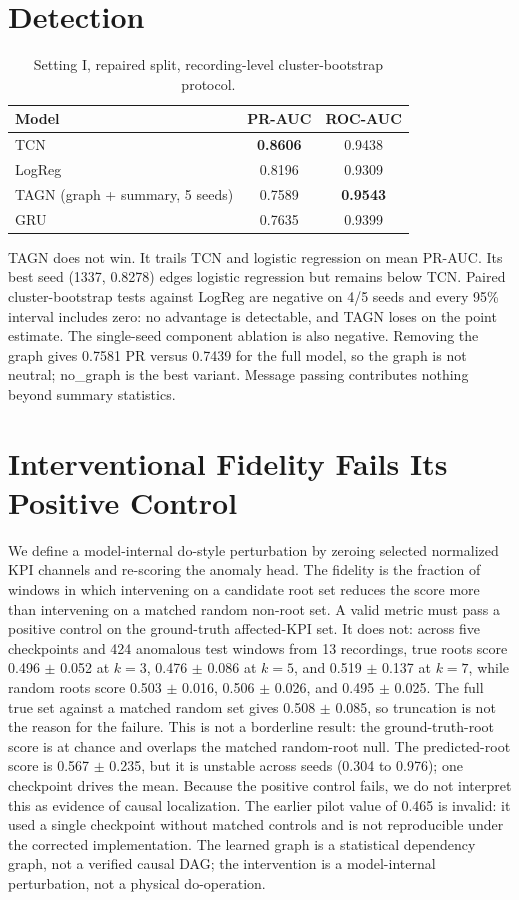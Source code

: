 \documentclass[10pt]{article}
\begin{document}
\section{Detection}
\begin{table}[h]
\centering
\begin{tabular}{lcc}
\toprule
Model & PR-AUC & ROC-AUC \\
\midrule
TCN & \textbf{0.8606} & 0.9438 \\
LogReg & 0.8196 & 0.9309 \\
TAGN (graph + summary, 5 seeds) & 0.7589 & \textbf{0.9543} \\
GRU & 0.7635 & 0.9399 \\
\bottomrule
\end{tabular}
\caption{Setting I, repaired split, recording-level cluster-bootstrap protocol.}
\end{table}

TAGN does not win. It trails TCN and logistic regression on mean PR-AUC. Its
best seed (1337, 0.8278) edges logistic regression but remains below TCN. Paired
cluster-bootstrap tests against LogReg are negative on 4/5 seeds and every 95\%
interval includes zero: no advantage is detectable, and TAGN loses on the point
estimate. The single-seed component ablation is also negative. Removing the graph gives
0.7581 PR versus 0.7439 for the full model, so the graph is not neutral;
no\_graph is the best variant. Message passing contributes nothing beyond
summary statistics.

\section{Interventional Fidelity Fails Its Positive Control}
We define a model-internal do-style perturbation by zeroing selected normalized
KPI channels and re-scoring the anomaly head. The fidelity is the fraction of
windows in which intervening on a candidate root set reduces the score more
than intervening on a matched random non-root set. A valid metric must pass a
positive control on the ground-truth affected-KPI set. It does not: across five
checkpoints and 424 anomalous test windows from 13 recordings, true roots score
0.496 $\pm$ 0.052 at $k=3$, 0.476 $\pm$ 0.086 at $k=5$, and
0.519 $\pm$ 0.137 at $k=7$, while random roots score
0.503 $\pm$ 0.016, 0.506 $\pm$ 0.026, and 0.495 $\pm$ 0.025. The full true set
against a matched random set gives 0.508 $\pm$ 0.085, so truncation is not the
reason for the failure. This is not a borderline result: the ground-truth-root
score is at chance and overlaps the matched random-root null. The predicted-root score is
0.567 $\pm$ 0.235, but it is unstable across seeds (0.304 to 0.976); one
checkpoint drives the mean. Because the positive control fails, we do not
interpret this as evidence of causal localization. The earlier pilot value of
0.465 is invalid: it used a single checkpoint without matched controls and is
not reproducible under the corrected implementation. The learned graph is a
statistical dependency graph, not a verified causal DAG; the intervention is a
model-internal perturbation, not a physical do-operation.
\end{document}
